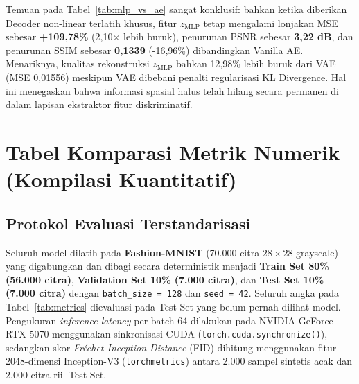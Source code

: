 \documentclass[11pt,a4paper]{article}
\begin{document}
\begin{table}[H]
\centering
\caption{Komparasi Kuantitatif Kandungan Informasi Fitur Laten ($d = 64$) pada Test Set Fashion-MNIST.}
\label{tab:mlp_vs_ae}
\end{table}

Temuan pada Tabel~\ref{tab:mlp_vs_ae} sangat konklusif: bahkan ketika diberikan Decoder non-linear terlatih khusus, fitur $z_{\text{MLP}}$ tetap mengalami lonjakan MSE sebesar \textbf{+109,78\%} (2,10$\times$ lebih buruk), penurunan PSNR sebesar \textbf{3,22 dB}, dan penurunan SSIM sebesar \textbf{0,1339} (-16,96\%) dibandingkan Vanilla AE. Menariknya, kualitas rekonstruksi $z_{\text{MLP}}$ bahkan 12,98\% lebih buruk dari VAE (MSE 0,01556) meskipun VAE dibebani penalti regularisasi KL Divergence. Hal ini menegaskan bahwa informasi spasial halus telah hilang secara permanen di dalam lapisan ekstraktor fitur diskriminatif.

\section{Tabel Komparasi Metrik Numerik (Kompilasi Kuantitatif)}

\subsection{Protokol Evaluasi Terstandarisasi}
Seluruh model dilatih pada \textbf{Fashion-MNIST} (70.000 citra $28 \times 28$ grayscale) yang digabungkan dan dibagi secara deterministik menjadi \textbf{Train Set 80\% (56.000 citra)}, \textbf{Validation Set 10\% (7.000 citra)}, dan \textbf{Test Set 10\% (7.000 citra)} dengan \texttt{batch\_size = 128} dan \texttt{seed = 42}. Seluruh angka pada Tabel~\ref{tab:metrics} dievaluasi pada Test Set yang belum pernah dilihat model. Pengukuran \textit{inference latency} per batch 64 dilakukan pada NVIDIA GeForce RTX 5070 menggunakan sinkronisasi CUDA (\texttt{torch.cuda.synchronize()}), sedangkan skor \textit{Fréchet Inception Distance} (FID) dihitung menggunakan fitur 2048-dimensi Inception-V3 (\texttt{torchmetrics}) antara 2.000 sampel sintetis acak dan 2.000 citra riil Test Set.
\end{document}
